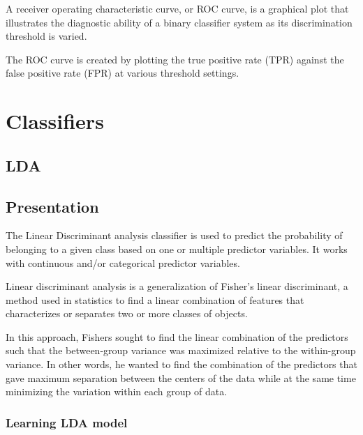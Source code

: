 \documentclass[
]{report}
\begin{document}
A receiver operating characteristic curve, or ROC curve, is a graphical plot that illustrates the diagnostic ability of a binary classifier system as its discrimination threshold is varied.

The ROC curve is created by plotting the true positive rate (TPR) against the false positive rate (FPR) at various threshold settings.

\hypertarget{classifiers}{%
\chapter{Classifiers}\label{classifiers}}

\hypertarget{lda}{%
\section{LDA}\label{lda}}

\hypertarget{presentation}{%
\section{Presentation}\label{presentation}}

The Linear Discriminant analysis classifier is used to predict the probability of belonging to a given class based on one or multiple predictor variables. It works with continuous and/or categorical predictor variables.

Linear discriminant analysis is a generalization of Fisher's linear discriminant, a method used in statistics to find a linear combination of features that characterizes or separates two or more classes of objects.

In this approach, Fishers sought to ﬁnd the linear combination of the predictors such that the between-group variance was maximized relative to the within-group variance. In other words, he wanted to ﬁnd the combination of the predictors that gave maximum separation between the centers of the data while at the same time minimizing the variation within each group of data.

\hypertarget{learning-lda-model}{%
\subsection{Learning LDA model}\label{learning-lda-model}}
\end{document}
